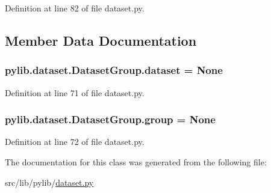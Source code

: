 Definition at line 82 of file dataset.\+py.



\subsection{Member Data Documentation}
\subsubsection[{\texorpdfstring{dataset}{dataset}}]{\setlength{\rightskip}{0pt plus 5cm}pylib.\+dataset.\+Dataset\+Group.\+dataset = None\hspace{0.3cm}{\ttfamily [static]}}\hypertarget{classpylib_1_1dataset_1_1DatasetGroup_a7ca4d83cc9dc0b5a1e47601dcdf94cd9}{}\label{classpylib_1_1dataset_1_1DatasetGroup_a7ca4d83cc9dc0b5a1e47601dcdf94cd9}


Definition at line 71 of file dataset.\+py.

\subsubsection[{\texorpdfstring{group}{group}}]{\setlength{\rightskip}{0pt plus 5cm}pylib.\+dataset.\+Dataset\+Group.\+group = None\hspace{0.3cm}{\ttfamily [static]}}\hypertarget{classpylib_1_1dataset_1_1DatasetGroup_a216c1c036170c5ed19b22f19652fd8fd}{}\label{classpylib_1_1dataset_1_1DatasetGroup_a216c1c036170c5ed19b22f19652fd8fd}


Definition at line 72 of file dataset.\+py.



The documentation for this class was generated from the following file\+:\begin{DoxyCompactItemize}
\item 
src/lib/pylib/\hyperlink{dataset_8py}{dataset.\+py}\end{DoxyCompactItemize}
